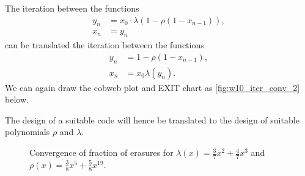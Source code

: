 The iteration between the functions
\begin{align*}
    y_{n} &= x_0\cdot\lambda(1-\rho(1-x_{n-1})),\\
    x_{n} &= y_n
\end{align*}
can be translated the iteration between the functions
\begin{align*}
    y_{n} &= 1 - \rho(1-x_{n-1}), \\
    x_n &= x_0\lambda(y_{n}).
\end{align*}
We can again draw the cobweb plot and EXIT chart as \autoref{fig:w10_iter_conv_2} below. 

The design of a suitable code will hence be translated to the design of suitable polynomials $\rho$ and $\lambda$.

\begin{figure}[H]
    \centering
    \hspace{0.1cm}
    \caption{Convergence of fraction of erasures for $\lambda(x) = \frac{3}{7}x^2 + \frac{4}{7}x^3$ and $\rho(x) = \frac{3}{8}x^5 + \frac{5}{8}x^{19}$.}
    \label{fig:w10_iter_conv_2}
\end{figure}
